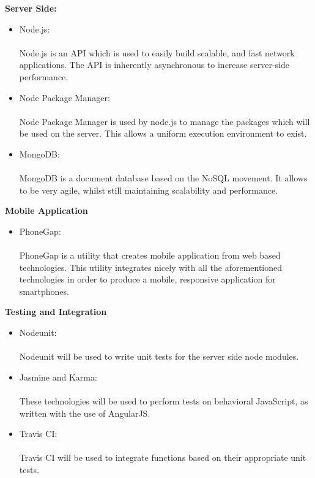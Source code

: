 {\bfseries Server Side:}
\begin{itemize}
	\item Node.js:\\ \\ 
	Node.js is an API which is used to easily build scalable, and fast network applications. The API is inherently asynchronous to increase server-side performance.
	\item Node Package Manager:\\ \\
	Node Package Manager is used by node.js to manage the packages which will be used on the server. This allows a uniform execution environment to exist.
	\item MongoDB: \\ \\
	MongoDB is a document database based on the NoSQL movement. It allows to be very agile, whilst still maintaining scalability and performance.
\end{itemize}
{\bfseries Mobile Application}
\begin{itemize}
	\item PhoneGap:\\ \\
	PhoneGap is a utility that creates mobile application from web based technologies. This utility integrates nicely with all the aforementioned technologies in order to produce a mobile, responsive application for smartphones.
\end{itemize}
{\bfseries Testing and Integration}
\begin{itemize}
	\item Nodeunit:\\ \\
	Nodeunit will be used to write unit tests for the server side node modules.
	\item Jasmine and Karma:\\ \\
	These technologies will be used to perform tests on behavioral JavaScript, as written with the use of AngularJS.
	\item Travis CI:\\ \\
	Travis CI will be used to integrate functions based on their appropriate unit tests.
\end{itemize}